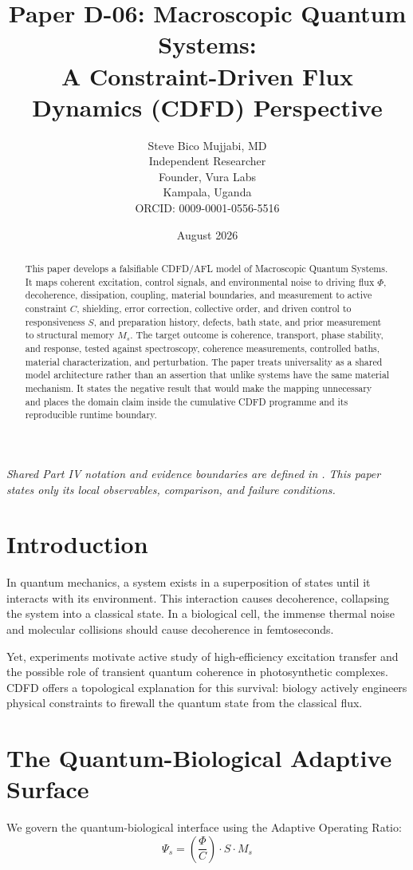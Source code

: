\documentclass[11pt,a4paper]{article}
\title{\textbf{Paper D-06: Macroscopic Quantum Systems:\\ A Constraint-Driven Flux Dynamics (CDFD) Perspective}}
\author{Steve Bico Mujjabi, MD\\
\small Independent Researcher\\
\small Founder, Vura Labs\\
\small Kampala, Uganda\\
\small ORCID: 0009-0001-0556-5516}
\date{August 2026}
\begin{document}
\maketitle

\noindent\textit{Shared Part IV notation and evidence boundaries are defined in . This paper states only its local observables, comparison, and failure conditions.}


\begin{abstract}
This paper develops a falsifiable CDFD/AFL model of Macroscopic Quantum Systems. It maps coherent excitation, control signals, and environmental noise to driving flux $\Phi$, decoherence, dissipation, coupling, material boundaries, and measurement to active constraint $C$, shielding, error correction, collective order, and driven control to responsiveness $S$, and preparation history, defects, bath state, and prior measurement to structural memory $M_s$. The target outcome is coherence, transport, phase stability, and response, tested against spectroscopy, coherence measurements, controlled baths, material characterization, and perturbation. The paper treats universality as a shared model architecture rather than an assertion that unlike systems have the same material mechanism. It states the negative result that would make the mapping unnecessary and places the domain claim inside the cumulative CDFD programme and its reproducible runtime boundary.
\end{abstract}

\section{Introduction}

In quantum mechanics, a system exists in a superposition of states until it interacts with its environment. This interaction causes decoherence, collapsing the system into a classical state. In a biological cell, the immense thermal noise and molecular collisions should cause decoherence in femtoseconds.

Yet, experiments motivate active study of high-efficiency excitation transfer and the possible role of transient quantum coherence in photosynthetic complexes. CDFD offers a topological explanation for this survival: biology actively engineers physical constraints to firewall the quantum state from the classical flux.

\section{The Quantum-Biological Adaptive Surface}
We govern the quantum-biological interface using the Adaptive Operating Ratio:
\begin{equation}
    \Psi_s = \left( \frac{\Phi}{C} \right) \cdot S \cdot M_s
\end{equation}
\end{document}
